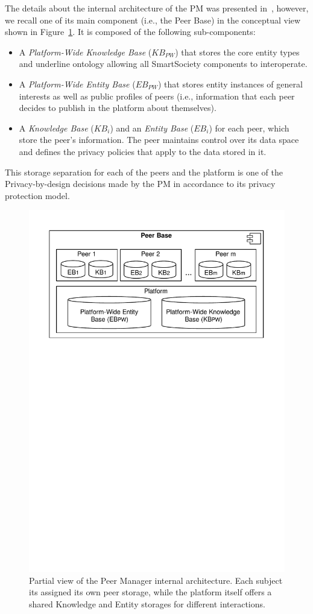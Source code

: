 The details about the internal architecture of the PM was presented in~\cite{D4.2,Hartswood:2015fe}, however, we recall one of its main component (i.e., the Peer Base) in the conceptual view shown in Figure~\ref{fig:peerManagerPlatform}. It is composed of the following sub-components: 
\begin{itemize}
\item A \emph{Platform-Wide Knowledge Base} (${KB}_{PW}$) that stores the core entity types and underline ontology allowing all SmartSociety components to interoperate. 
\item A \emph{Platform-Wide Entity Base} (${EB}_{PW}$) that stores entity instances of general interests as well as public profiles of peers (i.e., information that each peer decides to publish in the platform about themselves).
\item A \emph{Knowledge Base} (${KB}_i$) and an \emph{Entity Base} (${EB}_i$) for each peer, which store the peer’s information. The peer maintains control over its data space and defines the privacy policies that apply to the data stored in it. 
\end{itemize}
This storage separation for each of the peers and the platform is one of the Privacy-by-design decisions made by the PM in accordance to its privacy protection model.
%

\begin{figure}[t]
	\centering
	\includegraphics[width=0.65\linewidth]{figures/peerBase-diagram.pdf}
	\caption{Partial view of the Peer Manager internal architecture. Each subject its assigned its own peer storage, while the platform itself offers a shared Knowledge and Entity storages for different interactions.}
	\label{fig:peerManagerPlatform}
\end{figure}




